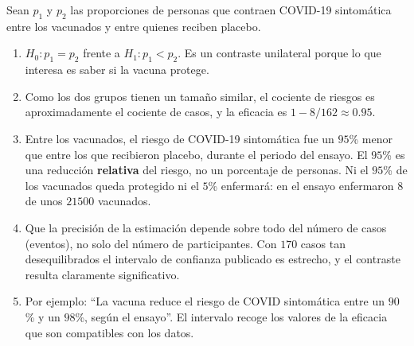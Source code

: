 \documentclass[
  spanish,
  a4paper,
]{scrreport}
\theoremstyle{definition}
\theoremstyle{remark}
\begin{document}
\begin{tcolorbox}[enhanced jigsaw, arc=.35mm, bottomrule=.15mm, bottomtitle=1mm, breakable, colback=white, colbacktitle=quarto-callout-tip-color!10!white, colframe=quarto-callout-tip-color-frame, coltitle=black, left=2mm, leftrule=.75mm, opacityback=0, opacitybacktitle=0.6, rightrule=.15mm, title=\textcolor{quarto-callout-tip-color}{\faLightbulb}\hspace{0.5em}{Solución}, titlerule=0mm, toprule=.15mm, toptitle=1mm]

Sean \(p_1\) y \(p_2\) las proporciones de personas que contraen
COVID-19 sintomática entre los vacunados y entre quienes reciben
placebo.

\begin{enumerate}
\def\labelenumi{\alph{enumi}.}
\item
  \(H_0: p_1=p_2\) frente a \(H_1: p_1<p_2\). Es un contraste unilateral
  porque lo que interesa es saber si la vacuna protege.
\item
  Como los dos grupos tienen un tamaño similar, el cociente de riesgos
  es aproximadamente el cociente de casos, y la eficacia es
  \(1-8/162\approx 0.95\).
\item
  Entre los vacunados, el riesgo de COVID-19 sintomática fue un \(95\)\%
  menor que entre los que recibieron placebo, durante el periodo del
  ensayo. El \(95\)\% es una reducción \textbf{relativa} del riesgo, no
  un porcentaje de personas. Ni el \(95\)\% de los vacunados queda
  protegido ni el \(5\)\% enfermará: en el ensayo enfermaron \(8\) de
  unos \(21500\) vacunados.
\item
  Que la precisión de la estimación depende sobre todo del número de
  casos (eventos), no solo del número de participantes. Con \(170\)
  casos tan desequilibrados el intervalo de confianza publicado es
  estrecho, y el contraste resulta claramente significativo.
\item
  Por ejemplo: ``La vacuna reduce el riesgo de COVID sintomática entre
  un \(90\)\% y un \(98\)\%, según el ensayo''. El intervalo recoge los
  valores de la eficacia que son compatibles con los datos.
\end{enumerate}

\end{tcolorbox}
\end{document}
